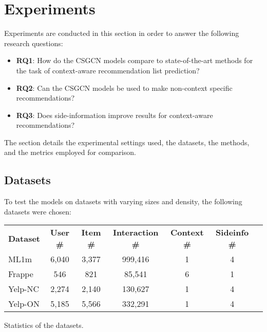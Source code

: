 \section{Experiments}\label{sec:experiments}
Experiments are conducted in this section in order to answer the following research questions:
\begin{itemize}
    \item \textbf{RQ1}: How do the CSGCN models compare to state-of-the-art methods for the task of context-aware recommendation list prediction?
    \item \textbf{RQ2}: Can the CSGCN models be used to make non-context specific recommendations?
    \item \textbf{RQ3}: Does side-information improve results for context-aware recommendations?
\end{itemize}
The section details the experimental settings used, the datasets, the methods, and the metrics employed for comparison.

\subsection{Datasets}\label{subsec:experimental-settings}
To test the models on datasets with varying sizes and density, the following datasets were chosen:\\

\begin{adjustwidth}{-2.5 cm}{-2.5 cm}\centering
\begin{threeparttable}[]
\scriptsize
\begin{tabular}{lcccccc}\toprule
\textbf{Dataset} &\textbf{User \#} &\textbf{Item \#} &\textbf{Interaction \#} &\textbf{Context \#} &\textbf{Sideinfo \#} \\\cmidrule{1-6}
ML1m &6,040 &3,377 &999,416 &1 &4 \\\cmidrule{1-6}
Frappe &546 & 821 &85,541 &6 &1 \\\cmidrule{1-6}
Yelp-NC &2,274 &2,140 &130,627 &1 &4 \\\cmidrule{1-6}
Yelp-ON &5,185 &5,566 &332,291 &1 &4 \\\midrule
\bottomrule
\end{tabular}
\caption{Statistics of the datasets.}\label{tab:datasetstats}
\end{threeparttable}
\end{adjustwidth}

